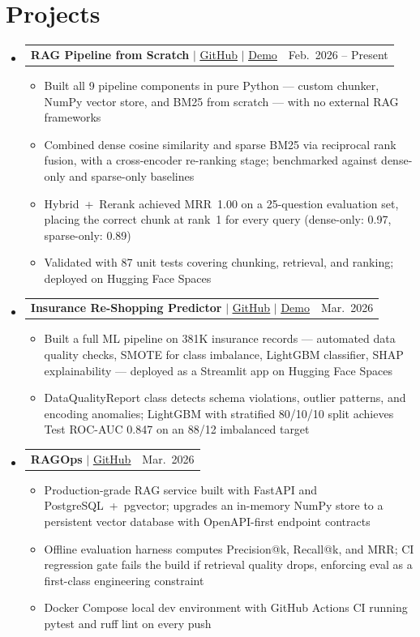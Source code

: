 \documentclass[letterpaper,11pt]{article}
\makeatletter
\newcommand{\resumeItem}[1]{
  \item\small{
    {#1 \vspace{-2pt}}
  }
}
\newcommand{\resumeProjectHeading}[2]{
    \item
    \begin{tabular*}{0.97\textwidth}{l@{\extracolsep{\fill}}r}
      \small#1 & \small #2 \\
    \end{tabular*}\vspace{-7pt}
}
\newcommand{\resumeSubHeadingListStart}{\begin{itemize}[leftmargin=0.15in, label={}]}
\newcommand{\resumeSubHeadingListEnd}{\end{itemize}}
\newcommand{\resumeItemListStart}{\begin{itemize}}
\newcommand{\resumeItemListEnd}{\end{itemize}\vspace{-5pt}}
\makeatother
\begin{document}
\section{Projects}
    \resumeSubHeadingListStart
      \resumeProjectHeading
          {\textbf{RAG Pipeline from Scratch} $|$
          \href{https://github.com/Archit-Konde/RAG}{\underline{GitHub}} $|$
          \href{https://huggingface.co/spaces/architechs/RAG}{\underline{Demo}}}{Feb.~2026 -- Present}
          \resumeItemListStart
            \resumeItem{Built all 9 pipeline components in pure Python --- custom chunker, NumPy
            vector store, and BM25 from scratch --- with no external RAG frameworks}
            \resumeItem{Combined dense cosine similarity and sparse BM25 via reciprocal rank
            fusion, with a cross-encoder re-ranking stage; benchmarked against dense-only
            and sparse-only baselines}
            \resumeItem{Hybrid~+~Rerank achieved MRR~1.00 on a 25-question evaluation set,
            placing the correct chunk at rank~1 for every query (dense-only: 0.97,
            sparse-only: 0.89)}
            \resumeItem{Validated with 87 unit tests covering chunking, retrieval, and ranking;
            deployed on Hugging Face Spaces}
          \resumeItemListEnd
      \resumeProjectHeading
          {\textbf{Insurance Re-Shopping Predictor} $|$
          \href{https://github.com/Archit-Konde/insurance-reshopping-predictor}{\underline{GitHub}} $|$
          \href{https://huggingface.co/spaces/architechs/insurance-reshopping-predictor}{\underline{Demo}}}{Mar.~2026}
          \resumeItemListStart
            \resumeItem{Built a full ML pipeline on 381K insurance records --- automated data
            quality checks, SMOTE for class imbalance, LightGBM classifier, SHAP
            explainability --- deployed as a Streamlit app on Hugging Face Spaces}
            \resumeItem{DataQualityReport class detects schema violations, outlier patterns,
            and encoding anomalies; LightGBM with stratified 80/10/10 split achieves
            Test ROC-AUC 0.847 on an 88/12 imbalanced target}
          \resumeItemListEnd
      \resumeProjectHeading
          {\textbf{RAGOps} $|$
          \href{https://github.com/Archit-Konde/RAGOps}{\underline{GitHub}}}{Mar.~2026}
          \resumeItemListStart
            \resumeItem{Production-grade RAG service built with FastAPI and
            PostgreSQL~+~pgvector; upgrades an in-memory NumPy store to a persistent
            vector database with OpenAPI-first endpoint contracts}
            \resumeItem{Offline evaluation harness computes Precision@k, Recall@k, and MRR;
            CI regression gate fails the build if retrieval quality drops, enforcing eval
            as a first-class engineering constraint}
            \resumeItem{Docker Compose local dev environment with GitHub Actions CI running
            pytest and ruff lint on every push}
          \resumeItemListEnd
    \resumeSubHeadingListEnd
\end{document}
